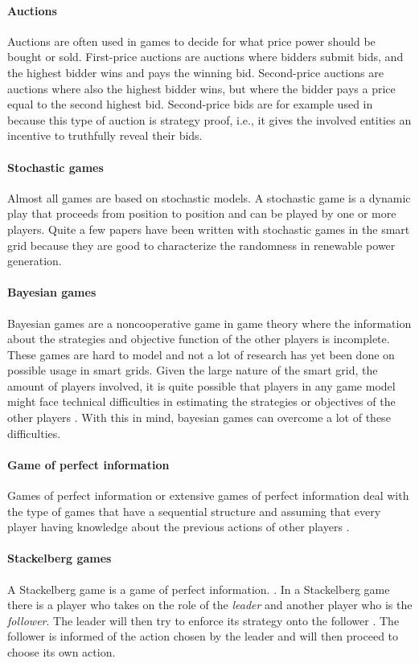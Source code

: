 \paragraph{Auctions}
Auctions are often used in games to decide for what price power should be bought or sold. First-price auctions are auctions where bidders submit bids, and the highest bidder wins and pays the winning bid. Second-price auctions are auctions where also the highest bidder wins, but where the bidder pays a price equal to the second highest bid. Second-price bids are for example used in \cite{SaadHanPoorEtAl2011} because this type of auction is strategy proof, i.e., it gives the involved entities an incentive to truthfully reveal their bids.
\paragraph{Stochastic games}
Almost all games are based on stochastic models. A stochastic game is a dynamic play that proceeds from position to position \cite{Shapley1953} and can be played by one or more players. Quite a few papers have been written with stochastic games in the smart grid \cite{LiangZhuang2014} because they are good to characterize the randomness in renewable power generation.  
\paragraph{Bayesian games}
Bayesian games are a noncooperative game in game theory where the information about the strategies and objective function of the other players is incomplete. These games are hard to model and not a lot of research has yet been done on possible usage in smart grids. Given the large nature of the smart grid, the amount of players involved, it is quite possible that players in any game model might face technical difficulties in estimating the strategies or objectives of the other players \cite{keypaper}. With this in mind, bayesian games can overcome a lot of these difficulties. 

\paragraph{Game of perfect information}
Games of perfect information or extensive games of perfect information deal with the type of games that have a sequential structure and assuming that every player having knowledge about the previous actions of other players \cite{CourseInGameTheory}.

\paragraph{Stackelberg games}
A Stackelberg game is a game of perfect information. \cite{CourseInGameTheory}.
In a Stackelberg game there is a player who takes on the role of the \textit{leader} and another player who is the \textit{follower}. The leader will then try to enforce its strategy onto the follower \cite{ShohamLeyton-Brown2008}. The follower is informed of the action chosen by the leader and will then proceed to choose its own action.

